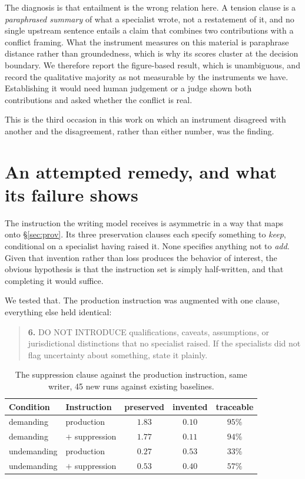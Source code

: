 \documentclass[11pt]{article}
\begin{document}
The diagnosis is that entailment is the wrong relation here. A tension clause
is a \emph{paraphrased summary} of what a specialist wrote, not a restatement
of it, and no single upstream sentence entails a claim that combines two
contributions with a conflict framing. What the instrument measures on this
material is paraphrase distance rather than groundedness, which is why its
scores cluster at the decision boundary. We therefore report the figure-based
result, which is unambiguous, and record the qualitative majority as not
measurable by the instruments we have. Establishing it would need human
judgement or a judge shown both contributions and asked whether the conflict
is real.

This is the third occasion in this work on which an instrument disagreed with
another and the disagreement, rather than either number, was the finding.


\section{An attempted remedy, and what its failure shows}
\label{sec:remedy}
The instruction the writing model receives is asymmetric in a way that maps
onto \S\ref{sec:prov}. Its three preservation clauses each specify something
to \emph{keep}, conditional on a specialist having raised it. None specifies
anything not to \emph{add}. Given that invention rather than loss produces
the behavior of interest, the obvious hypothesis is that the instruction set
is simply half-written, and that completing it would suffice.

We tested that. The production instruction was augmented with one clause,
everything else held identical:

\begin{quote}\small
\textbf{6.} DO NOT INTRODUCE qualifications, caveats, assumptions, or
jurisdictional distinctions that no specialist raised. If the specialists did
not flag uncertainty about something, state it plainly.
\end{quote}

\begin{table}[t]
\centering
\caption{The suppression clause against the production instruction, same
writer, 45 new runs against existing baselines.}
\label{tab:remedy}
\begin{tabular}{llccc}
\toprule
Condition & Instruction & preserved & invented & traceable \\
\midrule
demanding & production & $1.83$ & $0.10$ & $95\%$ \\
demanding & $+$ suppression & $1.77$ & $0.11$ & $94\%$ \\
\midrule
undemanding & production & $0.27$ & $0.53$ & $33\%$ \\
undemanding & $+$ suppression & $0.53$ & $0.40$ & $57\%$ \\
\bottomrule
\end{tabular}
\end{table}
\end{document}
